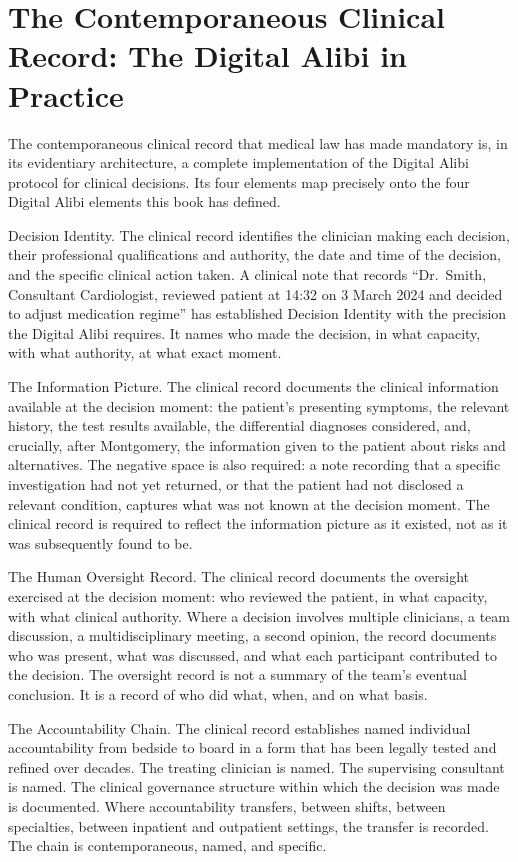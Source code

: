 \scenebreak

\section{The Contemporaneous Clinical Record: The Digital Alibi in Practice}

The contemporaneous clinical record that medical law has made mandatory is, in its evidentiary architecture, a complete implementation of the Digital Alibi protocol for clinical decisions. Its four elements map precisely onto the four Digital Alibi elements this book has defined.

Decision Identity. The clinical record identifies the clinician making each decision, their professional qualifications and authority, the date and time of the decision, and the specific clinical action taken. A clinical note that records ``Dr.~Smith, Consultant Cardiologist, reviewed patient at 14:32 on 3 March 2024 and decided to adjust medication regime'' has established Decision Identity with the precision the Digital Alibi requires. It names who made the decision, in what capacity, with what authority, at what exact moment.

The Information Picture. The clinical record documents the clinical information available at the decision moment: the patient's presenting symptoms, the relevant history, the test results available, the differential diagnoses considered, and, crucially, after Montgomery, the information given to the patient about risks and alternatives. The negative space is also required: a note recording that a specific investigation had not yet returned, or that the patient had not disclosed a relevant condition, captures what was not known at the decision moment. The clinical record is required to reflect the information picture as it existed, not as it was subsequently found to be.

The Human Oversight Record. The clinical record documents the oversight exercised at the decision moment: who reviewed the patient, in what capacity, with what clinical authority. Where a decision involves multiple clinicians, a team discussion, a multidisciplinary meeting, a second opinion, the record documents who was present, what was discussed, and what each participant contributed to the decision. The oversight record is not a summary of the team's eventual conclusion. It is a record of who did what, when, and on what basis.

The Accountability Chain. The clinical record establishes named individual accountability from bedside to board in a form that has been legally tested and refined over decades. The treating clinician is named. The supervising consultant is named. The clinical governance structure within which the decision was made is documented. Where accountability transfers, between shifts, between specialties, between inpatient and outpatient settings, the transfer is recorded. The chain is contemporaneous, named, and specific.

